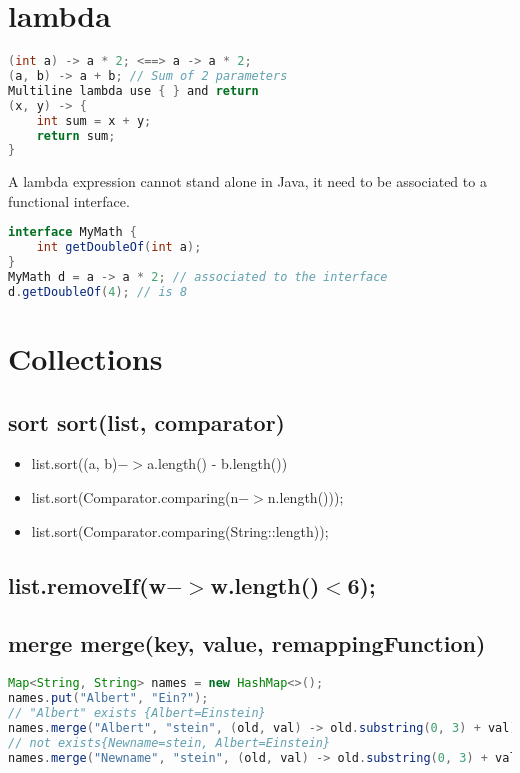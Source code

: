 \section{lambda}

\begin{lstlisting}[language=Java]
(int a) -> a * 2; <==> a -> a * 2;
(a, b) -> a + b; // Sum of 2 parameters
Multiline lambda use { } and return
(x, y) -> {
	int sum = x + y;
	return sum;
}
\end{lstlisting}

A lambda expression cannot stand alone in Java, it need to be associated to a functional interface.

\begin{lstlisting}[language=Java]
interface MyMath {
    int getDoubleOf(int a);
}
MyMath d = a -> a * 2; // associated to the interface
d.getDoubleOf(4); // is 8
\end{lstlisting}

\section{Collections}

\subsection{sort sort(list, comparator)}
\begin{itemize}
\item{list.sort((a, b)$->$a.length() - b.length())}
\item{list.sort(Comparator.comparing(n$->$n.length()));}
\item{list.sort(Comparator.comparing(String::length));}
\end{itemize}

\subsection{list.\textbf{removeIf}(w$->$w.length()$<$6);}

\subsection{merge merge(key, value, remappingFunction)}

\begin{lstlisting}[language=Java]
Map<String, String> names = new HashMap<>();
names.put("Albert", "Ein?");
// "Albert" exists {Albert=Einstein}
names.merge("Albert", "stein", (old, val) -> old.substring(0, 3) + val);
// not exists{Newname=stein, Albert=Einstein}
names.merge("Newname", "stein", (old, val) -> old.substring(0, 3) + val);
\end{lstlisting}

